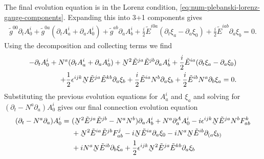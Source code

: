 \documentclass[10pt]{report}
\newcommand{\utilde}[1]{\underaccent{\tilde}{#1}}
\theoremstyle{definition}
\newcommand{\tE}[0]{\tilde{E}}
\newcommand{\tg}[0]{\tilde{g}}
\newcommand{\dlap}[0]{\utilde{N}}
\begin{document}
    The final evolution equation is in the Lorenz condition, \cref{eq:num-plebanski-lorenz-gauge-components}. Expanding this into 3+1 components gives 
    \begin{align}
        \tg^{00} \partial_t A^i_0 + \tg^{0a} (\partial_t A^i_a + \partial_a A^i_0) + \tg^{ab} \partial_a A^i_b + \frac{i}{2} \tE^{i0a} ( \partial_t \xi_a - \partial_a \xi_0) + \frac{i}{2} \tE^{iab} \partial_a \xi_b = 0.
    \end{align}
    Using the decomposition and collecting terms we find 
    \begin{align}
        -\partial_t A^i_0 + N^a (\partial_t A^i_a + \partial_a A^i_0) + \dlap^2 \tE^{ja} \tE^{jb} \partial_a A^i_b + \frac{i}{2} \tE^{ia}( \partial_t \xi_a - \partial_a \xi_0) \nonumber \\ + \frac{1}{2} \epsilon^{ijk} \dlap \tE^{ja} \tE^{kb} \partial_a \xi_b + \frac{i}{2} \tE^{ia} N^b \partial_a \xi_b + \frac{i}{2} \tE^{ib} N^a \partial_b \xi_a = 0.
    \end{align}
    Substituting the previous evolution equations for $A^i_a$ and $\xi_a$ and solving for $(\partial_t -N^a \partial_a) A^i_0$ gives our final connection evolution equation 
    \begin{align}
        (\partial_t - N^a \partial_a) A^i_0 = & \ (\dlap^2 \tE^{ja} \tE^{jb} - N^a N^b) \partial_a A^i_b + N^a \partial^A_a A^i_0 - i \epsilon^{ijk} \dlap \tE^{ja} N^b F^k_{ab} \nonumber \\ &\ + \dlap^2 \tE^{ia} \tE^{jb} F^j_{ab} - i \dlap \tE^{ia} \partial_a \xi_0 - i N^a \dlap \tE^{ib} \partial_{(a} \xi_{b)} \nonumber \\ &\  + i N^a \dlap \tE^{ib} \partial_b \xi_a + \frac{1}{2} \epsilon^{ijk} \dlap^2 \tE^{ja} \tE^{kb} \partial_a \xi_b
    \end{align}
\end{document}
